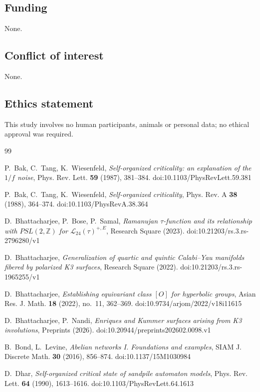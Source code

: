 \documentclass[11pt]{amsart}
\theoremstyle{definition}
\begin{document}
\subsection*{Funding}
None.

\subsection*{Conflict of interest}
None.

\subsection*{Ethics statement}
This study involves no human participants, animals or personal data; no ethical approval was required.

\begin{thebibliography}{99}\raggedright

 P.~Bak, C.~Tang, K.~Wiesenfeld, \emph{Self-organized criticality: an explanation of the $1/f$ noise}, Phys. Rev. Lett. \textbf{59} (1987), 381--384. doi:10.1103/PhysRevLett.59.381

 P.~Bak, C.~Tang, K.~Wiesenfeld, \emph{Self-organized criticality}, Phys. Rev. A \textbf{38} (1988), 364--374. doi:10.1103/PhysRevA.38.364

 D.~Bhattacharjee, P.~Bose, P.~Samal, \emph{Ramanujan $\tau$-function and its relationship with $PSL(2,\mathbb Z)$ for $\mathcal L_{24}(\tau)^{+,E}$}, Research Square (2023). doi:10.21203/rs.3.rs-2796280/v1

 D.~Bhattacharjee, \emph{Generalization of quartic and quintic Calabi--Yau manifolds fibered by polarized K3 surfaces}, Research Square (2022). doi:10.21203/rs.3.rs-1965255/v1

 D.~Bhattacharjee, \emph{Establishing equivariant class $[O]$ for hyperbolic groups}, Asian Res. J. Math. \textbf{18} (2022), no.~11, 362--369. doi:10.9734/arjom/2022/v18i11615

 D.~Bhattacharjee, P.~Nandi, \emph{Enriques and Kummer surfaces arising from K3 involutions}, Preprints (2026). doi:10.20944/preprints202602.0098.v1

 B.~Bond, L.~Levine, \emph{Abelian networks I. Foundations and examples}, SIAM J. Discrete Math. \textbf{30} (2016), 856--874. doi:10.1137/15M1030984

 D.~Dhar, \emph{Self-organized critical state of sandpile automaton models}, Phys. Rev. Lett. \textbf{64} (1990), 1613--1616. doi:10.1103/PhysRevLett.64.1613


\end{thebibliography}
\end{document}
